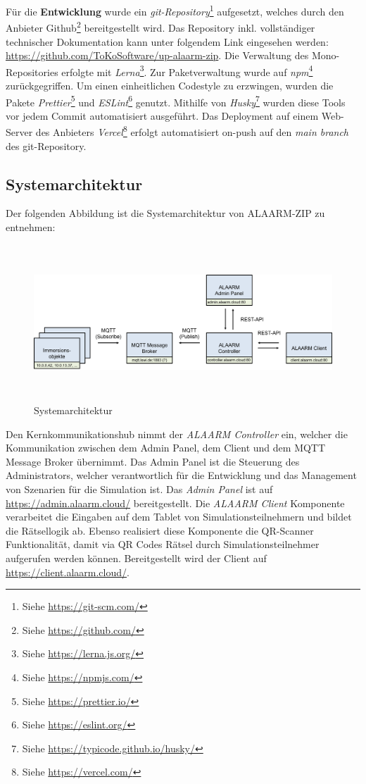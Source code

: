 Für die \textbf{Entwicklung} wurde ein \textit{git-Repository}\footnote{Siehe \href{https://git-scm.com/}{https://git-scm.com/}} aufgesetzt, welches durch den Anbieter Github\footnote{Siehe \href{https://github.com/}{https://github.com/}} bereitgestellt wird. Das Repository inkl. vollständiger technischer Dokumentation kann unter folgendem Link eingesehen werden:  \url{https://github.com/ToKoSoftware/up-alaarm-zip}. Die Verwaltung des Mono-Repositories erfolgte mit \textit{Lerna}\footnote{Siehe \href{https://lerna.js.org/}{https://lerna.js.org/}}. Zur Paketverwaltung wurde auf \textit{npm}\footnote{Siehe \href{https://npmjs.com/}{https://npmjs.com/}}  zurückgegriffen. Um einen einheitlichen Codestyle zu erzwingen, wurden die Pakete \textit{Prettier}\footnote{Siehe \href{https://prettier.io/}{https://prettier.io/}} und \textit{ESLint}\footnote{Siehe \href{https://eslint.org/}{https://eslint.org/}} genutzt. Mithilfe von \textit{Husky}\footnote{Siehe \href{https://typicode.github.io/husky/}{https://typicode.github.io/husky/}} wurden diese Tools vor jedem Commit automatisiert ausgeführt. Das Deployment auf einem Web-Server des Anbieters \textit{Vercel}\footnote{Siehe \href{https://vercel.com/}{https://vercel.com/}} erfolgt automatisiert on-push auf den \textit{main branch} des git-Repository.


\subsection{Systemarchitektur}
\label{chap:systemarchitecture}
Der folgenden Abbildung ist die Systemarchitektur von ALAARM-ZIP zu entnehmen:

\begin{figure}[h]
   \includegraphics[width=15cm, height=5.87cm]{res/20230809_architecture.png}
   \caption{Systemarchitektur}
\end{figure}


Den Kernkommunikationshub nimmt der \textit{ALAARM Controller} ein, welcher die Kommunikation zwischen dem Admin Panel, dem Client und dem MQTT Message Broker übernimmt. Das Admin Panel ist die Steuerung des Administrators, welcher verantwortlich für die Entwicklung und das Management von Szenarien für die Simulation ist.
Das \textit{Admin Panel} ist auf \href{https://admin.alaarm.cloud/}{https://admin.alaarm.cloud/} bereitgestellt.
Die \textit{ALAARM Client} Komponente verarbeitet die Eingaben auf dem Tablet von Simulationsteilnehmern und bildet die Rätsellogik ab. Ebenso realisiert diese Komponente die QR-Scanner Funktionalität, damit via QR Codes Rätsel durch Simulationsteilnehmer aufgerufen werden können. Bereitgestellt wird der Client auf \href{https://client.alaarm.cloud/}{https://client.alaarm.cloud/}.

